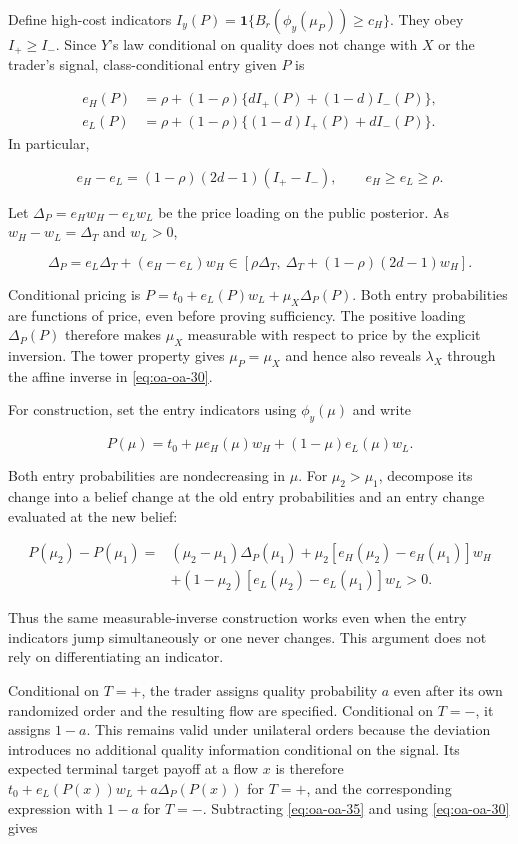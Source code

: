 \documentclass[
  11pt,
]{article}
\begin{document}
Define high-cost indicators
\(I_y(P)=\mathbf1\{B_r(\phi_y(\mu_P))\ge c_H\}\). They obey
\(I_+\ge I_-\). Since \(Y\)'s law conditional on quality does not change
with \(X\) or the trader's signal, class-conditional entry given \(P\)
is

\[
\begin{aligned}
e_H(P)&=\rho+(1-\rho)\{d I_+(P)+(1-d)I_-(P)\},\\
e_L(P)&=\rho+(1-\rho)\{(1-d)I_+(P)+dI_-(P)\}.
\end{aligned}
\tag{OA.32}\label{eq:oa-oa-32}
\] In particular,

\[
e_H-e_L=(1-\rho)(2d-1)(I_+-I_-),\qquad
e_H\ge e_L\ge\rho.
\tag{OA.33}\label{eq:oa-oa-33}
\]

Let \(\Delta_P=e_Hw_H-e_Lw_L\) be the price loading on the public
posterior. As \(w_H-w_L=\Delta_T\) and \(w_L>0\),

\[
\Delta_P=e_L\Delta_T+(e_H-e_L)w_H
\in[\rho\Delta_T,\ \Delta_T+(1-\rho)(2d-1)w_H].
\tag{OA.34}\label{eq:oa-oa-34}
\]

Conditional pricing is \(P=t_0+e_L(P)w_L+\mu_X\Delta_P(P)\). Both entry
probabilities are functions of price, even before proving sufficiency.
The positive loading \(\Delta_P(P)\) therefore makes \(\mu_X\) measurable
with respect to price by the explicit inversion. The tower property
gives \(\mu_P=\mu_X\) and hence also reveals \(\lambda_X\) through the
affine inverse in \eqref{eq:oa-oa-30}.

For construction, set the entry indicators using \(\phi_y(\mu)\) and
write

\[
P(\mu)=t_0+\mu e_H(\mu)w_H+(1-\mu)e_L(\mu)w_L.
\tag{OA.35}\label{eq:oa-oa-35}
\]

Both entry probabilities are nondecreasing in \(\mu\). For
\(\mu_2>\mu_1\), decompose its change into a belief change at the old
entry probabilities and an entry change evaluated at the new belief:

\[
\begin{aligned}
P(\mu_2)-P(\mu_1)
={}&(\mu_2-\mu_1)\Delta_P(\mu_1)
+\mu_2[e_H(\mu_2)-e_H(\mu_1)]w_H\\
&+(1-\mu_2)[e_L(\mu_2)-e_L(\mu_1)]w_L>0.
\end{aligned}
\tag{OA.36}\label{eq:oa-oa-36}
\]

Thus the same measurable-inverse construction works even when the entry
indicators jump simultaneously or one never changes. This argument does
not rely on differentiating an indicator.

Conditional on \(T=+\), the trader assigns quality probability \(a\)
even after its own randomized order and the resulting flow are
specified. Conditional on \(T=-\), it assigns \(1-a\). This remains
valid under unilateral orders because the deviation introduces no
additional quality information conditional on the signal. Its expected
terminal target payoff at a flow \(x\) is therefore
\(t_0+e_L(P(x))w_L+a\Delta_P(P(x))\) for \(T=+\), and the corresponding
expression with \(1-a\) for \(T=-\). Subtracting \eqref{eq:oa-oa-35} and
using \eqref{eq:oa-oa-30} gives
\end{document}

